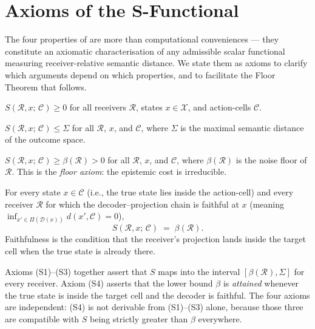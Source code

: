 \section{Axioms of the S-Functional}
\label{sec:s-axioms-ch02}

The four properties of  are more than computational
conveniences — they constitute an axiomatic characterisation of any
admissible scalar functional measuring receiver-relative semantic distance.
We state them as axioms to clarify which arguments depend on which properties,
and to facilitate the Floor Theorem that follows.

\begin{axiom}
\label{ax:s1}
$S(\mathcal{R}, x;\, \mathcal{C}) \geq 0$ for all receivers $\mathcal{R}$,
states $x \in \mathcal{X}$, and action-cells $\mathcal{C}$.
\end{axiom}

\begin{axiom}[S2 — Boundedness]
\label{ax:s2}
$S(\mathcal{R}, x;\, \mathcal{C}) \leq \Sigma$ for all $\mathcal{R}$, $x$,
and $\mathcal{C}$, where $\Sigma$ is the maximal semantic distance of the
outcome space.
\end{axiom}

\begin{axiom}
\label{ax:s3}
$S(\mathcal{R}, x;\, \mathcal{C}) \geq \beta(\mathcal{R}) > 0$ for all
$\mathcal{R}$, $x$, and $\mathcal{C}$, where $\beta(\mathcal{R})$ is the
noise floor of $\mathcal{R}$.  This is the \emph{floor axiom}: the epistemic
cost is irreducible.
\end{axiom}

\begin{axiom}
\label{ax:s4}
For every state $x \in \mathcal{C}$ (i.e., the true state lies inside the
action-cell) and every receiver $\mathcal{R}$ for which the decoder--projection
chain is faithful at $x$ (meaning $\inf_{x' \in \Pi(\mathcal{D}(x))} d(x',
\mathcal{C}) = 0$),
\[
  S(\mathcal{R}, x;\, \mathcal{C}) \;=\; \beta(\mathcal{R}) .
\]
Faithfulness is the condition that the receiver's projection lands inside the
target cell when the true state is already there.
\end{axiom}

\begin{remark}
Axioms (S1)--(S3) together assert that $S$ maps into the interval
$[\beta(\mathcal{R}), \Sigma]$ for every receiver.  Axiom (S4) asserts that
the lower bound $\beta$ is \emph{attained} whenever the true state is inside
the target cell and the decoder is faithful.  The four axioms are independent:
(S4) is not derivable from (S1)--(S3) alone, because those three are
compatible with $S$ being strictly greater than $\beta$ everywhere.
\end{remark}

